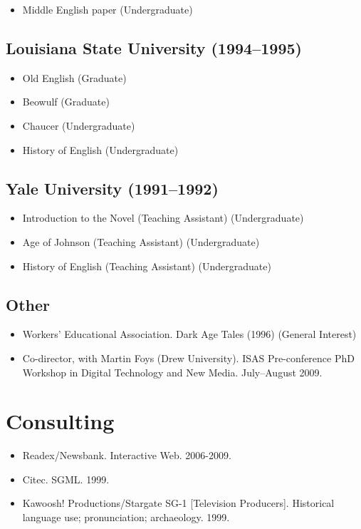 \documentclass[12pt]{article}
\begin{document}
\begin{itemize}
  \item Middle English paper (Undergraduate)
\end{itemize}


\subsection*{Louisiana State University (1994–1995)}

\begin{itemize}
  \item Old English (Graduate)
  \item Beowulf (Graduate)
  \item Chaucer (Undergraduate)
  \item History of English (Undergraduate)
\end{itemize}


\subsection*{Yale University (1991–1992)}

\begin{itemize}
  \item Introduction to the Novel (Teaching Assistant) (Undergraduate)
  \item Age of Johnson (Teaching Assistant) (Undergraduate)
  \item History of English (Teaching Assistant) (Undergraduate)
\end{itemize}


\subsection*{Other}

\begin{itemize}
  \item Workers’ Educational Association. Dark Age Tales (1996) (General Interest)
  \item Co-director, with Martin Foys (Drew University). ISAS Pre-conference PhD Workshop in Digital Technology and New Media. July–August 2009.
\end{itemize}


\section*{Consulting}

\begin{itemize}
  \item Readex/Newsbank. Interactive Web. 2006-2009.
  \item Citec. SGML. 1999.
  \item Kawoosh! Productions/Stargate SG-1 [Television Producers]. Historical language use; pronunciation; archaeology. 1999.
\end{itemize}
\end{document}

